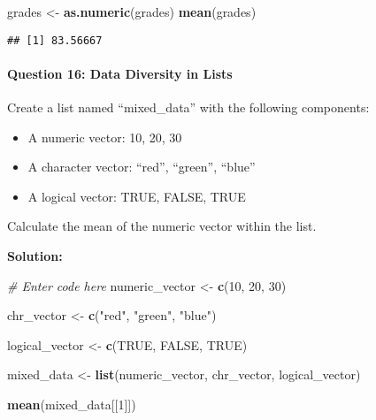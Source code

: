 \documentclass[
]{article}
\newenvironment{Shaded}{\begin{snugshade}}{\end{snugshade}}
\newcommand{\CommentTok}[1]{\textcolor[rgb]{0.56,0.35,0.01}{\textit{#1}}}
\newcommand{\ConstantTok}[1]{\textcolor[rgb]{0.56,0.35,0.01}{#1}}
\newcommand{\DecValTok}[1]{\textcolor[rgb]{0.00,0.00,0.81}{#1}}
\newcommand{\FunctionTok}[1]{\textcolor[rgb]{0.13,0.29,0.53}{\textbf{#1}}}
\newcommand{\NormalTok}[1]{#1}
\newcommand{\OtherTok}[1]{\textcolor[rgb]{0.56,0.35,0.01}{#1}}
\newcommand{\StringTok}[1]{\textcolor[rgb]{0.31,0.60,0.02}{#1}}
\begin{document}
\begin{Shaded}
\begin{Highlighting}[]
\NormalTok{grades }\OtherTok{\textless{}{-}} \FunctionTok{as.numeric}\NormalTok{(grades)}
\FunctionTok{mean}\NormalTok{(grades)}
\end{Highlighting}
\end{Shaded}

\begin{verbatim}
## [1] 83.56667
\end{verbatim}

\hypertarget{question-16-data-diversity-in-lists}{%
\paragraph{Question 16: Data Diversity in
Lists}\label{question-16-data-diversity-in-lists}}

Create a list named ``mixed\_data'' with the following components:

\begin{itemize}
\item
  A numeric vector: 10, 20, 30
\item
  A character vector: ``red'', ``green'', ``blue''
\item
  A logical vector: TRUE, FALSE, TRUE
\end{itemize}

Calculate the mean of the numeric vector within the list.

\textbf{Solution:}

\begin{Shaded}
\begin{Highlighting}[]
\CommentTok{\# Enter code here}
\NormalTok{numeric\_vector }\OtherTok{\textless{}{-}} \FunctionTok{c}\NormalTok{(}\DecValTok{10}\NormalTok{, }\DecValTok{20}\NormalTok{, }\DecValTok{30}\NormalTok{)}

\NormalTok{chr\_vector }\OtherTok{\textless{}{-}} \FunctionTok{c}\NormalTok{(}\StringTok{"red"}\NormalTok{, }\StringTok{"green"}\NormalTok{, }\StringTok{"blue"}\NormalTok{)}

\NormalTok{logical\_vector }\OtherTok{\textless{}{-}} \FunctionTok{c}\NormalTok{(}\ConstantTok{TRUE}\NormalTok{, }\ConstantTok{FALSE}\NormalTok{, }\ConstantTok{TRUE}\NormalTok{)}

\NormalTok{mixed\_data }\OtherTok{\textless{}{-}} \FunctionTok{list}\NormalTok{(numeric\_vector, chr\_vector, logical\_vector)}

\FunctionTok{mean}\NormalTok{(mixed\_data[[}\DecValTok{1}\NormalTok{]])}
\end{Highlighting}
\end{Shaded}
\end{document}
